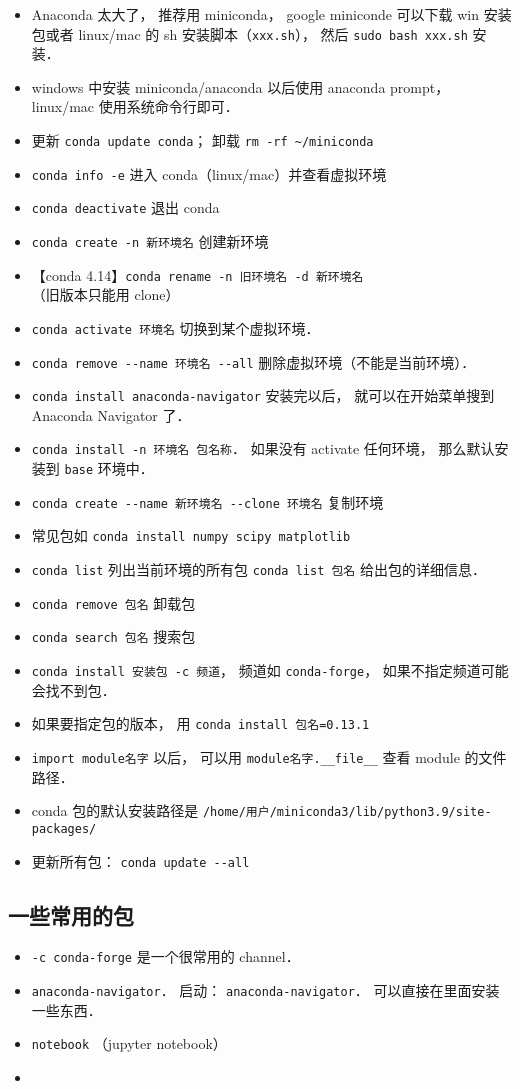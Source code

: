 
\begin{itemize}
\item Anaconda 太大了， 推荐用 miniconda， google miniconde 可以下载 win 安装包或者 linux/mac 的 sh 安装脚本（\verb|xxx.sh|）， 然后 \verb|sudo bash xxx.sh| 安装．
\item windows 中安装 miniconda/anaconda 以后使用 anaconda prompt， linux/mac 使用系统命令行即可．
\item 更新 \verb|conda update conda|； 卸载 \verb|rm -rf ~/miniconda|
\item \verb|conda info -e| 进入 conda（linux/mac）并查看虚拟环境
\item \verb|conda deactivate| 退出 conda
\item \verb|conda create -n 新环境名| 创建新环境
\item 【conda 4.14】\verb|conda rename -n 旧环境名 -d 新环境名| （旧版本只能用 clone）
\item \verb|conda activate 环境名| 切换到某个虚拟环境．
\item \verb|conda remove --name 环境名 --all| 删除虚拟环境（不能是当前环境）．
\item \verb|conda install anaconda-navigator| 安装完以后， 就可以在开始菜单搜到 Anaconda Navigator 了．
\item \verb|conda install -n 环境名 包名称|． 如果没有 activate 任何环境， 那么默认安装到 \verb|base| 环境中．
\item \verb|conda create --name 新环境名 --clone 环境名| 复制环境
\item 常见包如 \verb|conda install numpy scipy matplotlib|
\item \verb|conda list| 列出当前环境的所有包 \verb|conda list 包名| 给出包的详细信息．
\item \verb|conda remove 包名| 卸载包
\item \verb|conda search 包名| 搜索包
\item \verb|conda install 安装包 -c 频道|， 频道如 \verb|conda-forge|， 如果不指定频道可能会找不到包．
\item 如果要指定包的版本， 用 \verb|conda install 包名=0.13.1|
\item \verb|import module名字| 以后， 可以用 \verb|module名字.__file__| 查看 module 的文件路径．
\item conda 包的默认安装路径是 \verb|/home/用户/miniconda3/lib/python3.9/site-packages/|
\item 更新所有包： \verb|conda update --all|
\end{itemize}

\subsection{一些常用的包}
\begin{itemize}
\item \verb|-c conda-forge| 是一个很常用的 channel．
\item \verb|anaconda-navigator|． 启动： \verb|anaconda-navigator|． 可以直接在里面安装一些东西．
\item \verb|notebook| （jupyter notebook）
\item 
\end{itemize}
